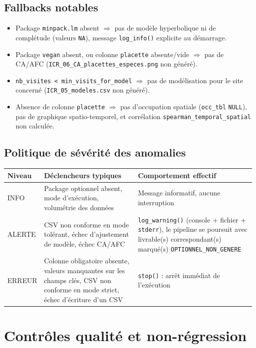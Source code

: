 \documentclass[11pt,a4paper]{article}
\begin{document}
\subsection{Fallbacks notables}
\begin{itemize}[leftmargin=1.2cm]
  \item Package \texttt{minpack.lm} absent $\Rightarrow$ pas de modèle hyperbolique ni de complétude (valeurs \texttt{NA}), message \texttt{log\_info()} explicite au démarrage.
  \item Package \texttt{vegan} absent, ou colonne \texttt{placette} absente/vide $\Rightarrow$ pas de CA/AFC (\texttt{ICR\_06\_CA\_placettes\_especes.png} non généré).
  \item \texttt{nb\_visites < min\_visits\_for\_model} $\Rightarrow$ pas de modélisation pour le site concerné (\texttt{ICR\_05\_modeles.csv} non généré).
  \item Absence de colonne \texttt{placette} $\Rightarrow$ pas d'occupation spatiale (\texttt{occ\_tbl} \texttt{NULL}), pas de graphique spatio-temporel, et corrélation \texttt{spearman\_temporal\_spatial} non calculée.
\end{itemize}

\subsection{Politique de sévérité des anomalies}
\begin{longtable}{|p{2.0cm}|p{6.0cm}|p{6.3cm}|}
\hline
\textbf{Niveau} & \textbf{Déclencheurs typiques} & \textbf{Comportement effectif} \\
\hline
INFO & Package optionnel absent, mode d'exécution, volumétrie des données & Message informatif, aucune interruption \\
\hline
ALERTE & CSV non conforme en mode tolérant, échec d'ajustement de modèle, échec CA/AFC & \texttt{log\_warning()} (console + fichier + \texttt{stderr}), le pipeline se poursuit avec livrable(s) correspondant(s) marqué(s) \texttt{OPTIONNEL\_NON\_GENERE} \\
\hline
ERREUR & Colonne obligatoire absente, valeurs manquantes sur les champs clés, CSV non conforme en mode strict, échec d'écriture d'un CSV & \texttt{stop()} : arrêt immédiat de l'exécution \\
\hline
\end{longtable}

\section{Contrôles qualité et non-régression}
\end{document}
